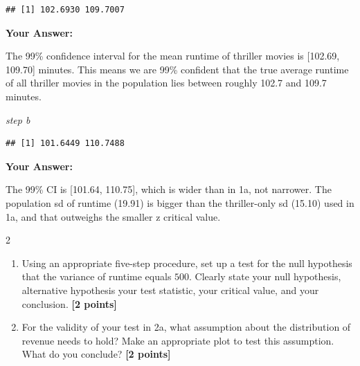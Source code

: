 \documentclass[
]{article}
\newenvironment{Shaded}{\begin{snugshade}}{\end{snugshade}}
\newcommand{\AttributeTok}[1]{\textcolor[rgb]{0.13,0.29,0.53}{#1}}
\newcommand{\ConstantTok}[1]{\textcolor[rgb]{0.56,0.35,0.01}{#1}}
\newcommand{\FloatTok}[1]{\textcolor[rgb]{0.00,0.00,0.81}{#1}}
\newcommand{\FunctionTok}[1]{\textcolor[rgb]{0.13,0.29,0.53}{\textbf{#1}}}
\newcommand{\NormalTok}[1]{#1}
\newcommand{\OtherTok}[1]{\textcolor[rgb]{0.56,0.35,0.01}{#1}}
\newcommand{\SpecialCharTok}[1]{\textcolor[rgb]{0.81,0.36,0.00}{\textbf{#1}}}
\providecommand{\tightlist}{%
  \setlength{\itemsep}{0pt}\setlength{\parskip}{0pt}}
\begin{document}
\begin{verbatim}
## [1] 102.6930 109.7007
\end{verbatim}

\textbf{Your Answer:}

The 99\% confidence interval for the mean runtime of thriller movies is
{[}102.69, 109.70{]} minutes. This means we are 99\% confident that the
true average runtime of all thriller movies in the population lies
between roughly 102.7 and 109.7 minutes.

\emph{step b}

\begin{Shaded}
\end{Shaded}

\begin{verbatim}
## [1] 101.6449 110.7488
\end{verbatim}

\textbf{Your Answer:}

The 99\% CI is {[}101.64, 110.75{]}, which is wider than in 1a, not
narrower. The population sd of runtime (19.91) is bigger than the
thriller-only sd (15.10) used in 1a, and that outweighs the smaller z
critical value.

2

\begin{enumerate}
\def\labelenumi{\alph{enumi}.}
\tightlist
\item
  Using an appropriate five-step procedure, set up a test for the null
  hypothesis that the variance of runtime equals \(500\). Clearly state
  your null hypothesis, alternative hypothesis your test statistic, your
  critical value, and your conclusion. \textbf{[2 points]}
\item
  For the validity of your test in 2a, what assumption about the
  distribution of revenue needs to hold? Make an appropriate plot to
  test this assumption. What do you conclude? \textbf{[2 points]}
\end{enumerate}
\end{document}
